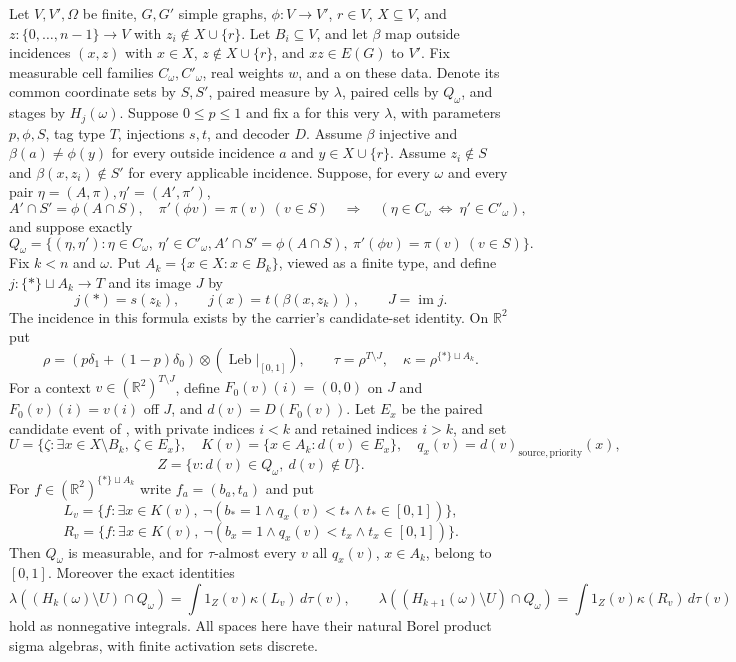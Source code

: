 \begin{lemma}
Let $V,V',\Omega$ be finite, $G,G'$ simple graphs, $\phi:V\to V'$,
$r\in V$, $X\subseteq V$, and $z:\{0,\ldots,n-1\}\to V$ with
$z_i\notin X\cup\{r\}$. Let $B_i\subseteq V$, and let $\beta$ map
outside incidences $(x,z)$ with $x\in X$, $z\notin X\cup\{r\}$,
and $xz\in E(G)$ to $V'$. Fix measurable cell families
$C_\omega,C'_\omega$, real weights $w$, and a
 on these
data. Denote its common coordinate sets by $S,S'$, paired measure by
$\lambda$, paired cells by $Q_\omega$, and stages by $H_j(\omega)$.
Suppose $0\le p\le1$ and fix a
 for this very
$\lambda$, with parameters $p,\phi,S$, tag type $T$, injections $s,t$,
and decoder $D$. Assume $\beta$ injective and
$\beta(a)\ne\phi(y)$ for every outside incidence $a$ and
$y\in X\cup\{r\}$. Assume $z_i\notin S$ and
$\beta(x,z_i)\notin S'$ for every applicable incidence. Suppose, for
every $\omega$ and every pair $\eta=(A,\pi),\eta'=(A',\pi')$,
\[
 A'\cap S'=\phi(A\cap S),\quad \pi'(\phi v)=\pi(v)\ (v\in S)
 \quad\Longrightarrow\quad
 (\eta\in C_\omega\ \Longleftrightarrow\ \eta'\in C'_\omega),
\]
and suppose exactly
\[
 Q_\omega=\{(\eta,\eta'): \eta\in C_\omega,\ \eta'\in C'_\omega,
 A'\cap S'=\phi(A\cap S),\ \pi'(\phi v)=\pi(v)\ (v\in S)\}.
\]
Fix $k<n$ and $\omega$. Put $A_k=\{x\in X:x\in B_k\}$, viewed as a
finite type, and define $j:\{*\}\sqcup A_k\to T$ and its image $J$ by
\[
 j(*)=s(z_k),\qquad j(x)=t(\beta(x,z_k)),\qquad J=\operatorname{im}j.
\]
The incidence in this formula exists by the carrier's candidate-set
identity. On $\mathbb R^2$ put
\[
 \rho=(p\delta_1+(1-p)\delta_0)\otimes
       (\operatorname{Leb}|_{[0,1]}),\qquad
 \tau=\rho^{T\setminus J},\quad \kappa=\rho^{\{*\}\sqcup A_k}.
\]
For a context $v\in(\mathbb R^2)^{T\setminus J}$, define
$F_0(v)(i)=(0,0)$ on $J$ and $F_0(v)(i)=v(i)$ off $J$, and
$d(v)=D(F_0(v))$. Let $E_x$ be the paired candidate event of
, with private
indices $i<k$ and retained indices $i>k$, and set
\[
 U=\{\zeta:\exists x\in X\setminus B_k,\ \zeta\in E_x\},\quad
 K(v)=\{x\in A_k:d(v)\in E_x\},\quad
 q_x(v)=d(v)_{\mathrm{source,priority}}(x),
\]
\[
 Z=\{v:d(v)\in Q_\omega,\ d(v)\notin U\}.
\]
For $f\in(\mathbb R^2)^{\{*\}\sqcup A_k}$ write $f_a=(b_a,t_a)$ and put
\[
 L_v=\{f:\exists x\in K(v),\ \neg(b_*=1\land q_x(v)<t_*\land t_*\in[0,1])\},
\]
\[
 R_v=\{f:\exists x\in K(v),\ \neg(b_x=1\land q_x(v)<t_x\land t_x\in[0,1])\}.
\]
Then $Q_\omega$ is measurable, and for $\tau$-almost every $v$ all
$q_x(v)$, $x\in A_k$, belong to $[0,1]$. Moreover the exact identities
\[
 \lambda((H_k(\omega)\setminus U)\cap Q_\omega)
   =\int 1_Z(v)\kappa(L_v)\,d\tau(v),\qquad
 \lambda((H_{k+1}(\omega)\setminus U)\cap Q_\omega)
   =\int 1_Z(v)\kappa(R_v)\,d\tau(v)
\]
hold as nonnegative integrals. All spaces here have their natural Borel
product sigma algebras, with finite activation sets discrete.
\end{lemma}
